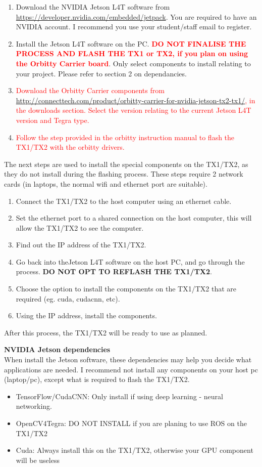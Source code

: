 \documentclass[12pt,a4paper]{article}
\newcommand{\orb}[1]{\textcolor{red}{#1}}
\begin{document}
    \begin{enumerate}
      \item Download the NVIDIA Jetson L4T software from \url{https://developer.nvidia.com/embedded/jetpack}. You are required to have an NVIDIA account. I recommend you use your student/staff email to register.
      \item Install the Jetson L4T software on the PC. \orb{\textbf{DO NOT FINALISE THE PROCESS AND FLASH THE TX1 or TX2, if you plan on using the Orbitty Carrier board}}. Only select components to install relating to your project. Please refer to section 2 on dependancies.
      \item \orb{Download the Orbitty Carrier components from \url{http://connecttech.com/product/orbitty-carrier-for-nvidia-jetson-tx2-tx1/}, in the downloads section. Select the version relating to the current Jetson L4T version and Tegra type.}
      \item \orb{Follow the step provided in the orbitty instruction manual to flash the TX1/TX2 with the orbitty drivers.}
    \end{enumerate}

    The next steps are used to install the special components on the TX1/TX2, as they do not install during the flashing process. These steps require 2 network cards (in laptops, the normal wifi and ethernet port are suitable).
    \begin{enumerate}
      \item Connect the TX1/TX2 to the host computer using an ethernet cable.
      \item Set the ethernet port to a shared connection on the host computer, this will allow the TX1/TX2 to see the computer.
      \item Find out the IP address of the TX1/TX2.
      \item Go back into theJetson L4T software on the host PC, and go through the process. \textbf{DO NOT OPT TO REFLASH THE TX1/TX2}.
      \item Choose the option to install the components on the TX1/TX2 that are required (eg. cuda, cudacnn, etc).
      \item Using the IP address, install the components. 
    \end{enumerate}

    After this process, the TX1/TX2 will be ready to use as planned. 
     

    \noindent
    \textbf{NVIDIA Jetson dependencies} \\
    When install the Jetson software, these dependencies may help you decide what applications are needed. I recommend not install any components on your host pc (laptop/pc), except what is required to flash the TX1/TX2.
    \begin{itemize}
      \item TensorFlow/CudaCNN: Only install if using deep learning - neural networking.
      \item OpenCV4Tegra: DO NOT INSTALL if you are planing to use ROS on the TX1/TX2
      \item Cuda: Always install this on the TX1/TX2, otherwise your GPU component will be useless
    \end{itemize}
\end{document}
